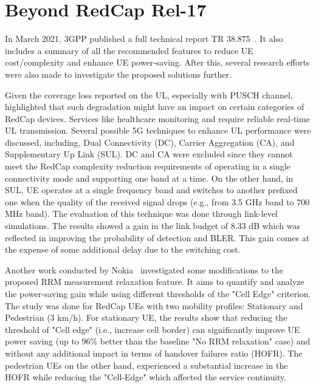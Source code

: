 \documentclass[]{IEEEtran}
\begin{document}
\section{Beyond RedCap Rel-17}
\label{sec:7-beyond-redcap17}



In March 2021, 3GPP published a full technical report TR 38.875~\cite{3gpp_study_2021_38.875}. 
It also includes a summary of all the recommended features to reduce UE cost/complexity and enhance UE power-saving.
After this, several research efforts were also made to investigate the proposed solutions further.

Given the coverage loss reported on the UL, especially with PUSCH channel,~\cite{saafi_enhancing_2022} highlighted that such degradation might have an impact on certain categories of RedCap devices. 
Services like healthcare monitoring and require reliable real-time UL transmission. Several possible 5G techniques to enhance UL performance were discussed, including, Dual Connectivity (DC), Carrier Aggregation (CA), and Supplementary Up Link (SUL). 
DC and CA were excluded since they cannot meet the RedCap complexity reduction requirements of operating in a single connectivity mode and supporting one band at a time. 
On the other hand, in SUL, UE operates at a single frequency band and switches to another prefixed one when the quality of the received signal drops (e.g., from 3.5 GHz band to 700 MHz band).
The evaluation of this technique was done through link-level simulations.
The results showed a gain in the link budget of 8.33 dB which was reflected in improving the probability of detection and BLER. 
This gain comes at the expense of some additional delay due to the switching cost.

Another work conducted by Nokia~\cite{tayyab_energy_2022} investigated some modifications to the proposed RRM measurement relaxation feature. 
It aims to quantify and analyze the power-saving gain while using different thresholds of the "Cell Edge" criterion. 
The study was done for RedCap UEs with two mobility profiles: Stationary and Pedestrian (3 km/h). For stationary UE, the results show that reducing the threshold of "Cell edge" (i.e., increase cell border) can significantly improve UE power saving (up to 96\% better than the baseline "No RRM relaxation" case) and without any additional impact in terms of handover failures ratio (HOFR). 
The pedestrian UEs on the other hand, experienced a substantial increase in the HOFR while reducing the "Cell-Edge" which affected the service continuity.
\end{document}

